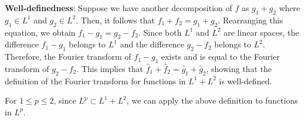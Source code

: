 \textbf{Well-definedness}: Suppose we have another decomposition of $f$ as $g_1 + g_2$ where $g_1 \in L^1$ and $g_2 \in L^2$. Then, it follows that $f_1 + f_2 = g_1 + g_2$. Rearranging this equation, we obtain $f_1 - g_1 = g_2 - f_2$. Since both $L^1$ and $L^2$ are linear spaces, the difference $f_1 - g_1$ belongs to $L^1$ and the difference $g_2 - f_2$ belongs to $L^2$. Therefore, the Fourier transform of $f_1 - g_1$ exists and is equal to the Fourier transform of $g_2 - f_2$. This implies that $\hat{f}_1 + \hat{f}_2 = \hat{g}_1 + \hat{g}_2$, showing that the definition of the Fourier transform for functions in $L^1 + L^2$ is well-defined.

\begin{definition}
    For $1 \leq p \leq 2$, since $L^p \subset L^1 + L^2$, we can apply the above definition to functions in $L^p$.
\end{definition}
